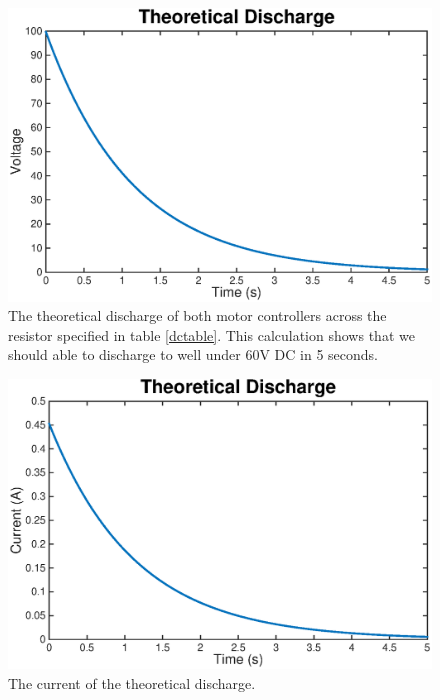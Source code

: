 \documentclass{article}
\begin{document}
            \begin{figure}[H]
                \centering
                \includegraphics[width = 0.8  \textwidth]{voltage.eps}
                \caption{The theoretical discharge of both motor controllers across the resistor specified in table \ref{dctable}. This calculation shows that we should able to discharge to well under 60V DC in 5 seconds.  }
                \label{discharge_volts}
            \end{figure}
            
            \begin{figure}[H]
                \centering
                \includegraphics[width = 0.8  \textwidth]{current.eps}
                \caption{The current of the theoretical discharge.}
                \label{discharge_amps}
            \end{figure}
            
            
\end{document}
